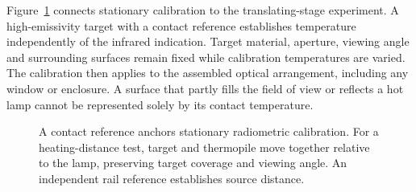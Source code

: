 Figure~\ref{fig:ir-distance-apparatus} connects stationary calibration to the translating-stage experiment. A high-emissivity target with a contact reference establishes temperature independently of the infrared indication. Target material, aperture, viewing angle and surrounding surfaces remain fixed while calibration temperatures are varied. The calibration then applies to the assembled optical arrangement, including any window or enclosure\cite{tmp006guide,tmp007cal}. A surface that partly fills the field of view or reflects a hot lamp cannot be represented solely by its contact temperature.

\begin{figure}[t]
\centering
{}
\caption{A contact reference anchors stationary radiometric calibration. For a heating-distance test, target and thermopile move together relative to the lamp, preserving target coverage and viewing angle. An independent rail reference establishes source distance.}
\label{fig:ir-distance-apparatus}
\end{figure}

